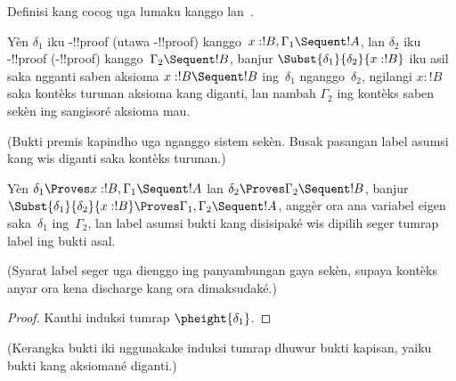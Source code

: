 \documentclass[../../../include/open-logic-section]{subfiles}
\begin{document}
Definisi kang cocog uga lumaku kanggo  lan~.

\begin{defn}
Yèn $\delta_1$ iku -!!{proof} (utawa
-!!{proof}) kanggo~$x:!B, \Gamma_1 \Sequent !A$,
lan $\delta_2$ iku -!!{proof}
(-!!{proof}) kanggo~$\Gamma_2 \Sequent !B$,
banjur $\Subst{\delta_1}{\delta_2}{x:!B}$ iku asil
saka ngganti saben aksioma $x:!B \Sequent !B$
ing~$\delta_1$ nganggo~$\delta_2$, ngilangi $x:!B$ saka kontèks turunan aksioma kang diganti,
lan nambah $\Gamma_2$ ing kontèks saben sekèn ing sangisoré
aksioma mau.
\end{defn}
(Bukti premis kapindho uga nganggo sistem sekèn. Busak pasangan label asumsi kang wis diganti saka kontèks turunan.)

\begin{prop}
Yèn $\delta_1 \Proves x:!B, \Gamma_1 \Sequent !A$
lan $\delta_2 \Proves \Gamma_2 \Sequent !B$,
banjur $\Subst{\delta_1}{\delta_2}{x:!B}
\Proves \Gamma_1, \Gamma_2 \Sequent !A$,
anggèr ora ana variabel eigen saka~$\delta_1$
ing~$\Gamma_2$, lan label asumsi bukti kang disisipaké wis
dipilih seger tumrap label ing bukti asal.
\end{prop}
(Syarat label seger uga dienggo ing panyambungan gaya sekèn, supaya kontèks anyar ora kena discharge kang ora dimaksudaké.)


\begin{proof}
  Kanthi induksi tumrap $\pheight{\delta_1}$.
\end{proof}
(Kerangka bukti iki nggunakake induksi tumrap dhuwur bukti kapisan, yaiku bukti kang aksiomané diganti.)
\end{document}
